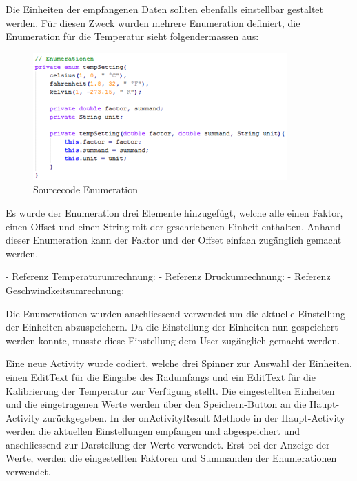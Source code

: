 Die Einheiten der empfangenen Daten sollten ebenfalls einstellbar gestaltet werden. Für diesen Zweck wurden mehrere Enumeration definiert, die Enumeration für die Temperatur sieht folgendermassen aus:

\begin{figure}[ht]
    \includegraphics{3Vorgehen/imag/app_tempSetting.png}
    \caption{Sourcecode Enumeration}
	\label{app_tempSetting} 
\end{figure}

Es wurde der Enumeration drei Elemente hinzugefügt, welche alle einen Faktor, einen Offset und einen String mit der geschriebenen Einheit enthalten. Anhand dieser Enumeration kann der Faktor und der Offset einfach zugänglich gemacht werden. 

- Referenz Temperaturumrechnung: %
- Referenz Druckumrechnung: %
- Referenz Geschwindkeitsumrechnung: %

Die Enumerationen wurden anschliessend verwendet um die aktuelle Einstellung der Einheiten abzuspeichern. Da die Einstellung der Einheiten nun gespeichert werden konnte, musste diese Einstellung dem User zugänglich gemacht werden.

Eine neue Activity wurde codiert, welche drei Spinner zur Auswahl der Einheiten, einen EditText für die Eingabe des Radumfangs und ein EditText für die Kalibrierung der Temperatur zur Verfügung stellt. Die eingestellten Einheiten und die eingetragenen Werte werden über den Speichern-Button an die Haupt-Activity zurückgegeben. In der onActivityResult Methode in der Haupt-Activity werden die aktuellen Einstellungen empfangen und abgespeichert und anschliessend zur Darstellung der Werte verwendet. Erst bei der Anzeige der Werte, werden die eingestellten Faktoren und Summanden der Enumerationen verwendet.

